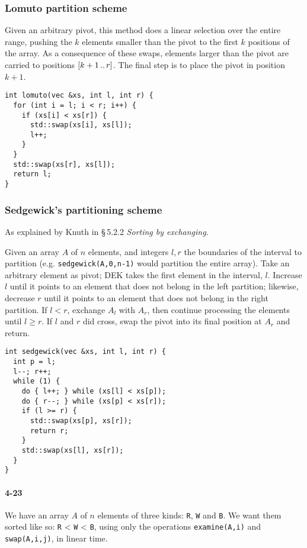 \documentclass{report}
\newcommand{\ldotsTwo}{%
  \mathinner{{\ldotp}{\ldotp}}%
}
\newcommand{\li}{\lstinline}
\begin{document}
\subsubsection*{Lomuto partition scheme}
Given an arbitrary pivot, this method does a linear selection over the entire range, pushing the $k$ elements smaller than the pivot to the first $k$ positions of the array. As a consequence of these swaps, elements larger than the pivot are carried to positions $[k+1 \ldotsTwo r]$. The final step is to place the pivot in position $k+1$.

\begin{lstlisting}
int lomuto(vec &xs, int l, int r) {
  for (int i = l; i < r; i++) {
    if (xs[i] < xs[r]) {
      std::swap(xs[i], xs[l]);
      l++;
    }
  }
  std::swap(xs[r], xs[l]);
  return l;
}
\end{lstlisting}

\subsubsection*{Sedgewick's partitioning scheme}
As explained by Knuth in \S\,5.2.2 {\sl Sorting by exchanging\/}.

Given an array $A$ of $n$ elements, and integers $l, r$ the boundaries of the interval to partition (e.g. \lstinline!sedgewick(A,0,n-1)! would partition the entire array). Take an arbitrary element as pivot; DEK takes the first element in the interval, $l$. Increase $l$ until it points to an element that does not belong in the left partition; likewise, decrease $r$ until it points to an element that does not belong in the right partition. If $l<r$, exchange $A_l$ with $A_r$, then continue processing the elements until $l\geq r$. If $l$ and $r$ did cross, swap the pivot into its final position at $A_r$ and return.

\begin{lstlisting}
int sedgewick(vec &xs, int l, int r) {
  int p = l;
  l--; r++;
  while (1) {
    do { l++; } while (xs[l] < xs[p]);
    do { r--; } while (xs[p] < xs[r]);
    if (l >= r) {
      std::swap(xs[p], xs[r]);
      return r;
    }
    std::swap(xs[l], xs[r]);
  }
}
\end{lstlisting}

\paragraph{4-23} We have an array $A$ of $n$ elements of three kinds: \li!R!, \li!W! and \li!B!. We want them sorted like so: \li!R! < \li!W! < \li!B!, using only the operations \li!examine(A,i)! and \li!swap(A,i,j)!, in linear time.
\end{document}
